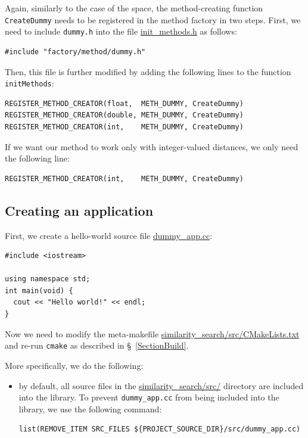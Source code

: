 \documentclass[runningheads,a4paper]{llncs}
\newcommand{\ttt}[1]{\texttt{#1}}
\begin{document}
{Again, similarly to the case of the space, 
the method-creating function \ttt{CreateDummy} needs
to be registered in the method factory in two steps.
First, we need to include \texttt{dummy.h} into the file
\href{https://github.com/searchivarius/NonMetricSpaceLib/blob/master/similarity_search/include/factory/init_methods.h}{init\_methods.h} as follows:
\begin{verbatim}
#include "factory/method/dummy.h"
\end{verbatim}
Then, this file is further modified by adding the following lines to the function \texttt{initMethods}:
\begin{verbatim}
REGISTER_METHOD_CREATOR(float,  METH_DUMMY, CreateDummy)
REGISTER_METHOD_CREATOR(double, METH_DUMMY, CreateDummy)
REGISTER_METHOD_CREATOR(int,    METH_DUMMY, CreateDummy)
\end{verbatim}

If we want our method to work only with integer-valued distances,
we only need the following line:
\begin{verbatim}
REGISTER_METHOD_CREATOR(int,    METH_DUMMY, CreateDummy)
\end{verbatim}

\subsection{Creating an application}\label{SectionCreateApp}
First, we create a hello-world source file 
\href{https://github.com/searchivarius/NonMetricSpaceLib/tree/master/similarity_search/src/dummy_app.cc}{dummy\_app.cc}:
\begin{verbatim}
#include <iostream>

using namespace std;
int main(void) {
  cout << "Hello world!" << endl;
}
\end{verbatim}
Now we need to modify the meta-makefile
\href{https://github.com/searchivarius/NonMetricSpaceLib/blob/master/similarity_search/src/CMakeLists.txt}{similarity\_search/src/CMakeLists.txt} and 
re-run \ttt{cmake} as described in \S~\ref{SectionBuild}.

\newpage
More specifically, we do the following:
\begin{itemize}
\item by default, all source files in the  
\href{https://github.com/searchivarius/NonMetricSpaceLib/blob/master/similarity_search/src/}{similarity\_search/src/} directory are included into the library.
To prevent \ttt{dummy\_app.cc} from being included into the library, we use the following command:
\begin{verbatim}
list(REMOVE_ITEM SRC_FILES ${PROJECT_SOURCE_DIR}/src/dummy_app.cc)
\end{verbatim}


\end{itemize}}
\end{document}
